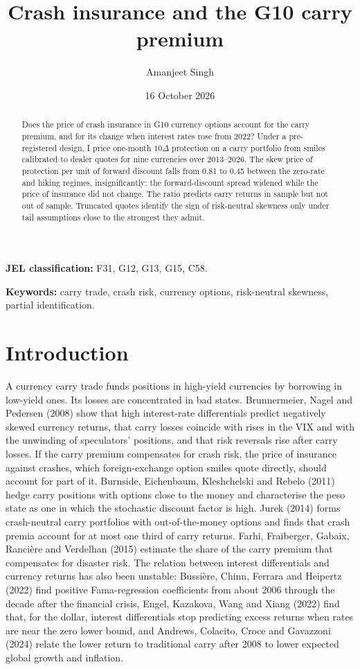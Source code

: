 \documentclass[11pt]{article}
\title{Crash insurance and the G10 carry premium}
\author{Amanjeet Singh}
\date{16 October 2026}
\theoremstyle{result}
\newcommand{\D}{\Delta}
\begin{document}
\maketitle

\begin{abstract}
\noindent Does the price of crash insurance in G10 currency options account for the carry premium, and for its change when interest rates rose from 2022? Under a pre-registered design, I price one-month $10\D$ protection on a carry portfolio from smiles calibrated to dealer quotes for nine currencies over 2013--2026. The skew price of protection per unit of forward discount falls from 0.81 to 0.45 between the zero-rate and hiking regimes, insignificantly: the forward-discount spread widened while the price of insurance did not change. The ratio predicts carry returns in sample but not out of sample. Truncated quotes identify the sign of risk-neutral skewness only under tail assumptions close to the strongest they admit.
\end{abstract}

\noindent\textbf{JEL classification:} F31, G12, G13, G15, C58.

\noindent\textbf{Keywords:} carry trade, crash risk, currency options, risk-neutral skewness, partial identification.

\section{Introduction}

A currency carry trade funds positions in high-yield currencies by borrowing in low-yield ones. Its losses are concentrated in bad states. Brunnermeier, Nagel and Pedersen (2008) show that high interest-rate differentials predict negatively skewed currency returns, that carry losses coincide with rises in the VIX and with the unwinding of speculators' positions, and that risk reversals rise after carry losses. If the carry premium compensates for crash risk, the price of insurance against crashes, which foreign-exchange option smiles quote directly, should account for part of it. Burnside, Eichenbaum, Kleshchelski and Rebelo (2011) hedge carry positions with options close to the money and characterise the peso state as one in which the stochastic discount factor is high. Jurek (2014) forms crash-neutral carry portfolios with out-of-the-money options and finds that crash premia account for at most one third of carry returns. Farhi, Fraiberger, Gabaix, Ranci\`ere and Verdelhan (2015) estimate the share of the carry premium that compensates for disaster risk. The relation between interest differentials and currency returns has also been unstable: Bussi\`ere, Chinn, Ferrara and Heipertz (2022) find positive Fama-regression coefficients from about 2006 through the decade after the financial crisis, Engel, Kazakova, Wang and Xiang (2022) find that, for the dollar, interest differentials stop predicting excess returns when rates are near the zero lower bound, and Andrews, Colacito, Croce and Gavazzoni (2024) relate the lower return to traditional carry after 2008 to lower expected global growth and inflation.
\end{document}
